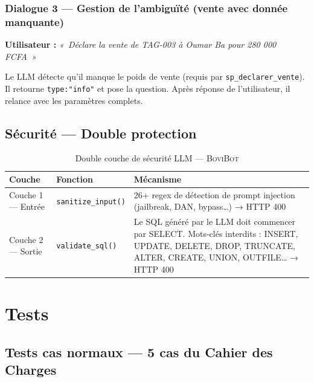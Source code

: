 \documentclass[12pt, a4paper, oneside]{report}
\newcommand{\bovirowcolors}{\rowcolors{2}{bovilight}{white}}
\newcommand{\bovibot}{\textsc{BoviBot}}
\begin{document}
\subsection{Dialogue 3 — Gestion de l'ambiguïté (vente avec donnée manquante)}

\textbf{Utilisateur :} \textit{«~Déclare la vente de TAG-003 à Oumar Ba pour 280 000 FCFA~»}

Le LLM détecte qu'il manque le poids de vente (requis par \texttt{sp\_declarer\_vente}).
Il retourne \texttt{type:"info"} et pose la question. Après réponse de l'utilisateur,
il relance avec les paramètres complets.

\section{Sécurité — Double protection}

\begin{table}[H]
\caption{Double couche de sécurité LLM — \bovibot{}}
\label{tab:securite}
\small\bovirowcolors
\begin{tabularx}{\textwidth}{@{}L{4cm}L{4cm}X@{}}
  \toprule
  \textbf{Couche} & \textbf{Fonction} & \textbf{Mécanisme} \\
  \midrule
  Couche 1 — Entrée & \texttt{sanitize\_input()} & 26+ regex de détection de prompt injection (jailbreak, DAN, bypass…) → HTTP 400 \\
  Couche 2 — Sortie & \texttt{validate\_sql()}   & Le SQL généré par le LLM doit commencer par SELECT. Mots-clés interdits : INSERT, UPDATE, DELETE, DROP, TRUNCATE, ALTER, CREATE, UNION, OUTFILE… → HTTP 400 \\
  \bottomrule
\end{tabularx}
\end{table}

\chapter{Tests}

\section{Tests cas normaux — 5 cas du Cahier des Charges}
\end{document}
